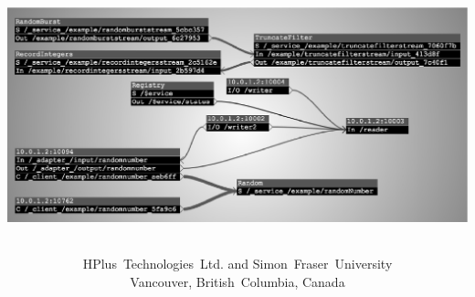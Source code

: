 \documentclass[letterpaper,titlepage,twoside]{report}
\title{\cal\Huge\textitcorr{\mplusm{}}\\
\vspace{1ex}
\begin{center}\includegraphics{ChannelManager.eps}\end{center}}
\author{HPlus~Technologies~Ltd. and Simon~Fraser~University\\
Vancouver, British~Columbia, Canada}
\newcommand{\mymark}{}
\newcommand*{\insertpart}[2]{\clearpage\renewcommand{\mymark}{#1}#2}
\renewcommand{\mymark}{#4}%
\begin{document}

\maketitle

\insertpart{Contents}{\tableofcontents}
\insertpart{List~of~Figures}{\listoffigures}




\clearpage{}
















\appendix






\insertpart{Index}{\printindex}
\end{document}
